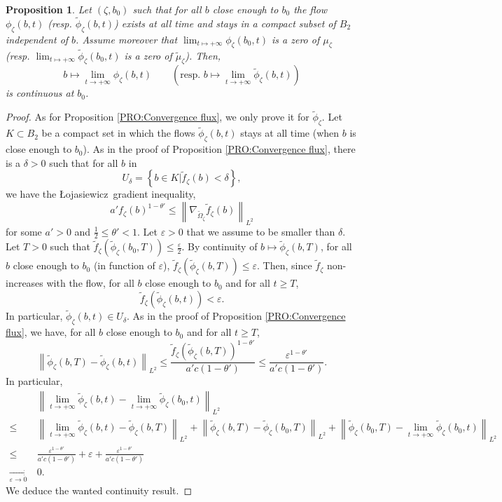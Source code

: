 \documentclass{article}
\newtheorem{proposition}[theorem]{Proposition}
\theoremstyle{remark}
\theoremstyle{definition}
\newcommand{\tend}[2]{\underset{#1 \rightarrow #2}{\longrightarrow}}
\newcommand{\norme}[1]{\left\| #1 \right\|}
\newcommand{\Lo}{Łojasiewicz}
\renewcommand{\leq}{\leqslant}
\renewcommand{\geq}{\geqslant}
\begin{document}
\begin{proposition}\label{PRO:Duistermaat}
    Let $(\zeta,b_0)$ such that for all $b$ close enough to $b_0$ the flow $\phi_\zeta(b,t)$ (resp. $\tilde{\phi}_\zeta(b,t)$) exists at all time and stays in a compact subset of $B_2$ independent of $b$. Assume moreover that $\lim_{t \mapsto +\infty} \phi_\zeta(b_0,t)$ is a zero of $\mu_\zeta$ (resp. $\lim_{t \mapsto +\infty} \tilde{\phi}_\zeta(b_0,t)$ is a zero of $\tilde{\mu}_\zeta$). Then,
    $$
    b \mapsto \lim_{t \rightarrow +\infty} \phi_\zeta(b,t) \qquad \left(\textrm{resp. } b \mapsto \lim_{t \rightarrow +\infty} \tilde{\phi}_\zeta(b,t)\right)
    $$
    is continuous at $b_0$.
\end{proposition}
\begin{proof}
As for Proposition \ref{PRO:Convergence flux}, we only prove it for $\tilde{\phi}_\zeta$. Let $K \subset B_2$ be a compact set in which the flows $\tilde{\phi}_\zeta(b,t)$ stays at all time (when $b$ is close enough to $b_0$). As in the proof of Proposition \ref{PRO:Convergence flux}, there is a $\delta > 0$ such that for all $b$ in
$$
U_\delta = \left\{b \in K|\tilde{f}_\zeta(b) < \delta\right\},
$$
we have the \Lo\ gradient inequality,
$$
a'f_\zeta(b)^{1 - \theta'} \leq \norme{\nabla_{\tilde{\Omega}_\zeta}\tilde{f}_\zeta(b)}_{L^2}
$$
for some $a' > 0$ and $\frac{1}{2} \leq \theta' < 1$. Let $\varepsilon > 0$ that we assume to be smaller than $\delta$. Let $T > 0$ such that $\tilde{f}_\zeta(\tilde{\phi}_\zeta(b_0,T)) \leq \frac{\varepsilon}{2}$. By continuity of $b \mapsto \tilde{\phi}_\zeta(b,T)$, for all $b$ close enough to $b_0$ (in function of $\varepsilon$), $\tilde{f}_\zeta(\tilde{\phi}_\zeta(b,T)) \leq \varepsilon$. Then, since $\tilde{f}_\zeta$ non-increases with the flow, for all $b$ close enough to $b_0$ and for all $t \geq T$,
$$
\tilde{f}_\zeta(\tilde{\phi}_\zeta(b,t)) < \varepsilon.
$$
In particular, $\tilde{\phi}_\zeta(b,t) \in U_\delta$. As in the proof of Proposition \ref{PRO:Convergence flux}, we have, for all $b$ close enough to $b_0$ and for all $t \geq T$,
$$
\norme{\tilde{\phi}_\zeta(b,T) - \tilde{\phi}_\zeta(b,t)}_{L^2} \leq \frac{\tilde{f}_\zeta(\tilde{\phi}_\zeta(b,T))^{1 - \theta'}}{a'c(1 - \theta')} \leq \frac{\varepsilon^{1 - \theta'}}{a'c(1 - \theta')}.
$$
In particular,
\begin{align*}
    & \norme{\lim_{t \rightarrow +\infty} \tilde{\phi}_\zeta(b,t) - \lim_{t \rightarrow +\infty} \tilde{\phi}_\zeta(b_0,t)}_{L^2}\\
    \leq\ & \norme{\lim_{t \rightarrow +\infty} \tilde{\phi}_\zeta(b,t) - \tilde{\phi}_\zeta(b,T)}_{L^2} + \norme{\tilde{\phi}_\zeta(b,T) - \tilde{\phi}_\zeta(b_0,T)}_{L^2} + \norme{\tilde{\phi}_\zeta(b_0,T) - \lim_{t \rightarrow +\infty} \tilde{\phi}_\zeta(b_0,t)}_{L^2}\\
    \leq\ & \frac{\varepsilon^{1 - \theta'}}{a'c(1 - \theta')} + \varepsilon + \frac{\varepsilon^{1 - \theta'}}{a'c(1 - \theta')}\\
    \tend{\varepsilon}{0}\ & 0.
\end{align*}
We deduce the wanted continuity result.
\end{proof}
\end{document}
